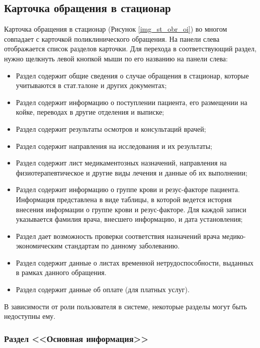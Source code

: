 \subsection{Карточка обращения в стационар} 

Карточка обращения в стационар (Рисунок \ref{img_st_obr_oi}) во многом совпадает с карточкой поликлинического обращения. На панели слева отображается список разделов карточки. Для перехода в соответствующий раздел, нужно щелкнуть левой кнопкой мыши по его названию на панели слева:
\begin{itemize}
 \item Раздел  содержит общие сведения о случае обращения в стационар, которые учитываются в стат.талоне и других документах;
 \item Раздел  содержит информацию о поступлении пациента, его размещении на койке, переводах в другие отделения  и выписке;
 \item Раздел  содержит результаты осмотров и консультаций врачей;
 \item Раздел  содержит направления на исследования и их результаты;
 \item Раздел  содержит лист медикаментозных назначений, направления на физиотерапевтическое и другие виды лечения и данные об их выполнении;
 \item Раздел  содержит информацию о группе крови и резус-факторе пациента. Информация представлена в виде таблицы, в которой ведется история внесения информации о группе крови и резус-факторе. Для каждой записи указывается фамилия врача, внесшего информацию, и дата установления;
 \item Раздел  дает возможность проверки соответствия назначений врача медико-экономическим стандартам по данному заболеванию.
  \item Раздел  содержит данные о листах временной нетрудоспособности, выданных в рамках данного обращения.
 \item Раздел  содержит данные об оплате (для платных услуг).
\end{itemize}
 
В зависимости от роли пользователя в системе, некоторые разделы могут быть недоступны ему.

\subsubsection{Раздел <<Основная информация>>}

